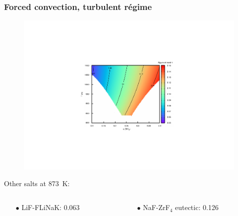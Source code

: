 \documentclass{beamer}
\begin{document}
\begin{frame}
   \frametitle{Forced convection, turbulent r\'egime}
   \begin{figure}
   \includegraphics[width=.6\textwidth]{merit1}
   \end{figure}

  Other salts at 873~K:
    \begin{columns}
      \begin{column}{6cm}
        \begin{itemize}
           \item[$\bullet$] LiF-FLiNaK: 0.063
        \end{itemize}
      \end{column}
      \begin{column}{6cm}
        \begin{itemize}
           \item[$\bullet$] NaF-ZrF$_4$ eutectic: 0.126
        \end{itemize}
      \end{column}
   \end{columns}
   
\end{frame}
\end{document}
